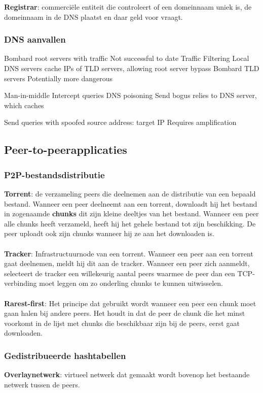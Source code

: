 
\textbf{Registrar}: commerciële entiteit die controleert of een domeinnaam uniek is, de domeinnaam in de DNS plaatst en daar geld voor vraagt.

\clearpage

\subsubsection{DNS aanvallen}


\bi
\itf Bombard root servers with traffic
    \bi
    \itf Not successful to date
    \itf Traffic Filtering
    \itf Local DNS servers cache IPs of TLD servers, allowing root server bypass
    \ei
\itf Bombard TLD servers
    \bi
\itf Potentially more dangerous
    \ei
\ei


\bi
\itf Man-in-middle
    \bi
    \itf Intercept queries
    \ei
\itf DNS poisoning
    \bi
    \itf Send bogus relies to DNS server, which caches
    \ei
\ei


\bi
\itf Send queries with spoofed source address: target IP
\itf Requires amplification
\ei

\subsection{Peer-to-peerapplicaties}

\subsubsection{P2P-bestandsdistributie}

\textbf{Torrent}: de verzameling peers die deelnemen aan de distributie van een bepaald bestand. Wanneer een peer deelneemt aan een torrent, downloadt hij het bestand in zogenaamde \textbf{chunks} dit zijn kleine deeltjes van het bestand. Wanneer een peer alle chunks heeft verzameld, heeft hij het gehele bestand tot zijn beschikking. De peer uploadt ook zijn chunks wanneer hij ze aan het downloaden is.\\\\
\textbf{Tracker}: Infrastructuurnode van een torrent. Wanneer een peer aan een torrent gaat deelnemen, meldt hij dit aan de tracker. Wanneer een peer zich aanmeldt, selecteert de tracker een willekeurig aantal peers waarmee de peer dan een TCP-verbinding moet leggen om zo onderling chunks te kunnen uitwisselen.\\\\
\textbf{Rarest-first}: Het principe dat gebruikt wordt wanneer een peer een chunk moet gaan halen bij andere peers. Het houdt in dat de peer de chunk die het minst voorkomt in de lijst met chunks die beschikbaar zijn bij de peers, eerst gaat downloaden.

\subsubsection{Gedistribueerde hashtabellen}

\textbf{Overlaynetwerk}: virtueel netwerk dat gemaakt wordt bovenop het bestaande netwerk tussen de peers.